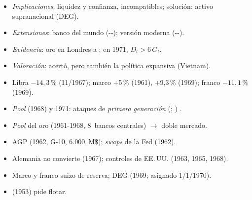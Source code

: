 \documentclass{article}
\begin{document}
\begin{columnas}
\begin{itemize}
  \begin{itemize}
  \item Corrida bancaria contra un banco central .
  \end{itemize}
\item \emph{Implicaciones}: liquidez y confianza, incompatibles; solución: activo supranacional (DEG).
\item \emph{Extensiones}: banco del mundo (--); versión moderna (--).
\end{itemize}
\begin{itemize}
\item \emph{Evidencia}: oro en Londres a ; en 1971, $D_t>6\,G_t$.
\item \emph{Valoración}: acertó, pero también la política expansiva (Vietnam).
\end{itemize}
\begin{itemize}
\item Libra $-14{,}3$\,\% (11/1967); marco +5\,\% (1961), +9,3\,\% (1969); franco $-11{,}1$\,\% (1969).
\item \emph{Pool} (1968) y 1971: ataques de \emph{primera generación} (; ) .
\end{itemize}
\begin{itemize}
\item \emph{Pool} del oro (1961-1968, 8~bancos centrales) $\to$ doble mercado.
\item AGP (1962, G-10, 6.000~M\$); \emph{swaps} de la Fed (1962).
\item Alemania no convierte (1967); controles de EE.\,UU. (1963, 1965, 1968).
\item Marco y franco suizo de reserva; DEG (1969; asignado 1/1/1970).
\item {} (1953) pide flotar.
\end{itemize}


\end{columnas}
\end{document}
